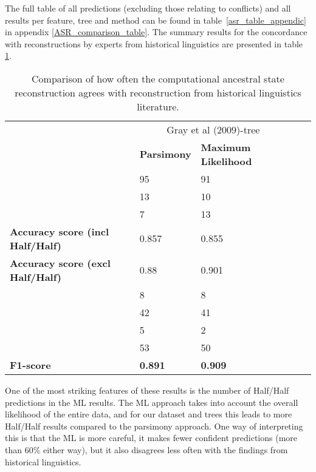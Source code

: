 \documentclass[a4paper,10pt]{article} %
\begin{document}
The full table of all predictions (excluding those relating to conflicts) and all results per feature, tree and method can be found in table~\ref{asr_table_appendic} in appendix \ref{ASR_comparison_table}. The summary results for the concordance with reconstructions by experts from historical linguistics are presented in table \ref{reconstruction_summary_table}. 
 
\begin{table}[H]
\centering
\caption{Comparison of how often the computational ancestral state reconstruction agrees with reconstruction from historical linguistics literature.}
\label{reconstruction_summary_table}
\begin{tabular}{|p{5cm}| p{2cm}|  p{2cm}| p{2cm} | p{2cm} |}
\hline
& \multicolumn{2}{c|}{Gray et al (2009)-tree}\\ \cline{2-3}
& \textbf{Parsimony} & \textbf{Maximum Likelihood} \\ \hline

 \cellcolor{hedvig_lightgreen!50}{Agree} & 95 & 91 \\ \hline
\cellcolor{hedvig_red!50}{Disagree} &13&10\\ \hline
 \cellcolor{hedvig_yellow!50}{Half / Half} &7&13\\ \hline

 \textbf{Accuracy score (incl Half/Half)} &0.857& 0.855 \\ \hline
 \textbf{Accuracy score (excl Half/Half)} &0.88&0.901\\ \hline
\cellcolor{hedvig_red!50}{False Negatives} &8 &8  \\ \hline
 \cellcolor{hedvig_lightgreen!50}{True Negatives} &42 &41\\ \hline
\cellcolor{hedvig_red!50}{False Positives} &5&2\\ \hline
 \cellcolor{hedvig_lightgreen!50}{True Positives} &53&50\\ \hline
\textbf{F1-score} & \textbf{0.891} & \textbf{0.909} \\ \hline


\end{tabular}
\end{table}

One of the most striking features of these results is the number of Half/Half predictions in the ML results. The ML approach takes into account the overall likelihood of the entire data, and for our dataset and trees this leads to more Half/Half results compared to the parsimony approach. One way of interpreting this is that the ML is more careful, it makes fewer confident predictions (more than 60\% either way), but it also disagrees less often with the findings from historical linguistics.
\end{document}
